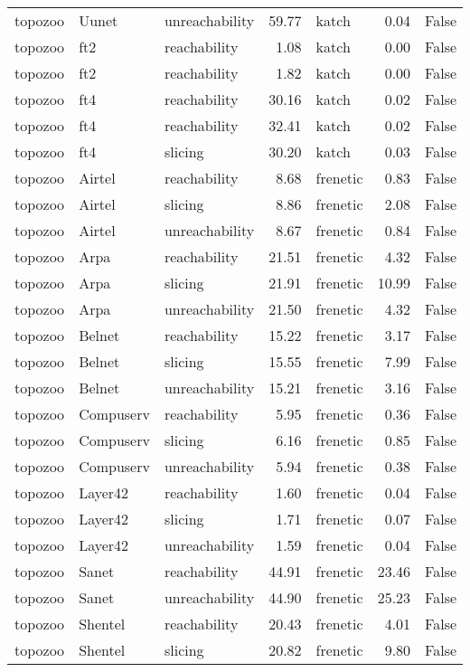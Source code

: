 \begin{tabular}{lllrlrr}
topozoo & Uunet & unreachability & 59.77 & katch & 0.04 & False \\
topozoo & ft2 & reachability & 1.08 & katch & 0.00 & False \\
topozoo & ft2 & reachability & 1.82 & katch & 0.00 & False \\
topozoo & ft4 & reachability & 30.16 & katch & 0.02 & False \\
topozoo & ft4 & reachability & 32.41 & katch & 0.02 & False \\
topozoo & ft4 & slicing & 30.20 & katch & 0.03 & False \\
topozoo & Airtel & reachability & 8.68 & frenetic & 0.83 & False \\
topozoo & Airtel & slicing & 8.86 & frenetic & 2.08 & False \\
topozoo & Airtel & unreachability & 8.67 & frenetic & 0.84 & False \\
topozoo & Arpa & reachability & 21.51 & frenetic & 4.32 & False \\
topozoo & Arpa & slicing & 21.91 & frenetic & 10.99 & False \\
topozoo & Arpa & unreachability & 21.50 & frenetic & 4.32 & False \\
topozoo & Belnet & reachability & 15.22 & frenetic & 3.17 & False \\
topozoo & Belnet & slicing & 15.55 & frenetic & 7.99 & False \\
topozoo & Belnet & unreachability & 15.21 & frenetic & 3.16 & False \\
topozoo & Compuserv & reachability & 5.95 & frenetic & 0.36 & False \\
topozoo & Compuserv & slicing & 6.16 & frenetic & 0.85 & False \\
topozoo & Compuserv & unreachability & 5.94 & frenetic & 0.38 & False \\
topozoo & Layer42 & reachability & 1.60 & frenetic & 0.04 & False \\
topozoo & Layer42 & slicing & 1.71 & frenetic & 0.07 & False \\
topozoo & Layer42 & unreachability & 1.59 & frenetic & 0.04 & False \\
topozoo & Sanet & reachability & 44.91 & frenetic & 23.46 & False \\
topozoo & Sanet & unreachability & 44.90 & frenetic & 25.23 & False \\
topozoo & Shentel & reachability & 20.43 & frenetic & 4.01 & False \\
topozoo & Shentel & slicing & 20.82 & frenetic & 9.80 & False \\

\end{tabular}
